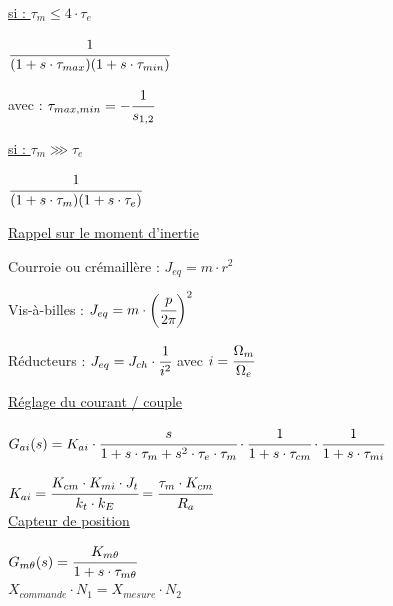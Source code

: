 \documentclass[	DIV=calc,%
							paper=a4,%
							fontsize=10pt,%
							twocolumn]{scrartcl} %
\newcommand{\formtitle}[1]{\large\underline{#1}}
\begin{document}
\vspace{3mm}

\formtitle{si :  $\tau_m \leqslant 4 \cdot\tau_e$}

\vspace{3mm}

{\hfill $ \cfrac{1}{(1+s\cdot \tau_{max})(1+s\cdot \tau_{min})}$\hfill}

avec : {\hfill $\tau_{max,min} = -\cfrac{1}{s_{1,2}}$\hfill}

\vspace{3mm}

\formtitle{si : $\tau_m \ggg \tau_e $}

{\hfill $ \cfrac{1}{(1+s\cdot \tau_{m})(1+s\cdot \tau_{e})}$\hfill}

 \newpage

 \formtitle{Rappel sur le moment d’inertie}

 \vspace{3mm}

Courroie ou crémaillère : $J_{eq} = m \cdot r^2$

\vspace{3mm}

Vis-à-billes : $J_{eq} = m \cdot \biggl(\cfrac{p}{2\pi}\biggr)^2$


\vspace{3mm}

Réducteurs : $J_{eq} = J_{ch}\cdot \cfrac{1}{i^2} $ \quad avec $ i = \cfrac{\Omega_m}{\Omega_e}$ 

\vspace{3mm}

\formtitle{Réglage du courant / couple}

\vspace{3mm}

\resizebox{.5\textwidth}{!}
{
    {$G_{ai}(s) = K_{ai} \cdot \cfrac{s}{1+s \cdot \tau_m + s^2 \cdot \tau_e \cdot \tau_m} \cdot \cfrac{1}{1+s \cdot \tau_{cm}}\cdot \cfrac{1}{1+s \cdot \tau_{mi}} $}
}

\vspace{3mm}

{$K_{ai} = \cfrac{K_{cm} \cdot K_{mi} \cdot J_t}{k_t \cdot k_E}  = \cfrac{\tau_m\cdot K_{cm}}{R_a}$}\\


\formtitle{Capteur de position}

\vspace{3mm}
$G_{m\theta}(s) = \cfrac{K_{m\theta}}{1+s\cdot\tau_{m\theta}} $\\

$X_{commande} \cdot N_1 = X_{mesure} \cdot N_2$
\end{document}
